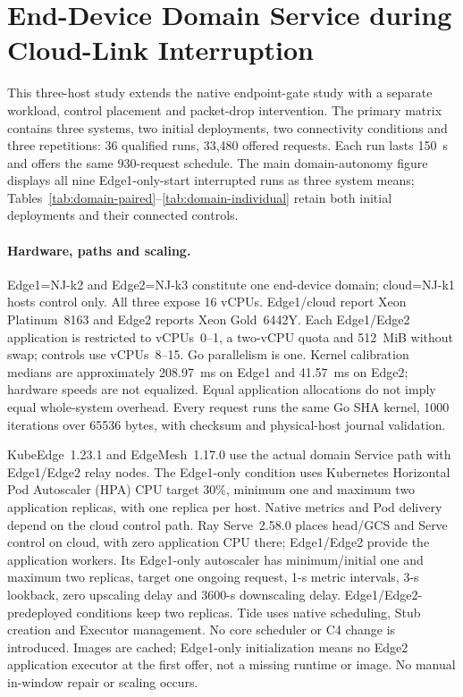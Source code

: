 \section{End-Device Domain Service during Cloud-Link Interruption}
\label{sec:supp-domain-resilience}
This three-host study extends the native endpoint-gate study with a separate workload, control placement and packet-drop intervention. The primary matrix contains three systems, two initial deployments, two connectivity conditions and three repetitions: 36 qualified runs, 33,480 offered requests. Each run lasts 150~s and offers the same 930-request schedule. The main domain-autonomy figure displays all nine Edge1-only-start interrupted runs as three system means; Tables~\ref{tab:domain-paired}--\ref{tab:domain-individual} retain both initial deployments and their connected controls.

\paragraph{Hardware, paths and scaling.}
Edge1=NJ-k2 and Edge2=NJ-k3 constitute one end-device domain; cloud=NJ-k1 hosts control only. All three expose 16 vCPUs. Edge1/cloud report Xeon Platinum~8163 and Edge2 reports Xeon Gold~6442Y. Each Edge1/Edge2 application is restricted to vCPUs~0--1, a two-vCPU quota and 512~MiB without swap; controls use vCPUs~8--15. Go parallelism is one. Kernel calibration medians are approximately 208.97~ms on Edge1 and 41.57~ms on Edge2; hardware speeds are not equalized. Equal application allocations do not imply equal whole-system overhead. Every request runs the same Go SHA kernel, 1000 iterations over 65536 bytes, with checksum and physical-host journal validation.

KubeEdge~1.23.1 and EdgeMesh~1.17.0 use the actual domain Service path with Edge1/Edge2 relay nodes. The Edge1-only condition uses Kubernetes Horizontal Pod Autoscaler (HPA) CPU target 30\%, minimum one and maximum two application replicas, with one replica per host. Native metrics and Pod delivery depend on the cloud control path. Ray Serve~2.58.0 places head/GCS and Serve control on cloud, with zero application CPU there; Edge1/Edge2 provide the application workers. Its Edge1-only autoscaler has minimum/initial one and maximum two replicas, target one ongoing request, 1-s metric intervals, 3-s lookback, zero upscaling delay and 3600-s downscaling delay. Edge1/Edge2-predeployed conditions keep two replicas. Tide uses native scheduling, Stub creation and Executor management. No core scheduler or C4 change is introduced. Images are cached; Edge1-only initialization means no Edge2 application executor at the first offer, not a missing runtime or image. No manual in-window repair or scaling occurs.

